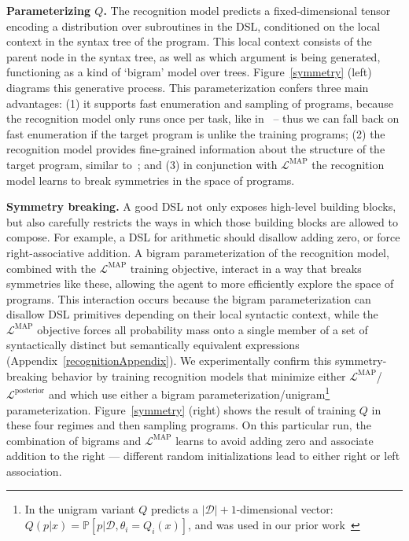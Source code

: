 \documentclass{article}
\newcommand{\probability}{\mathds{P}} %
\begin{document}
\noindent\textbf{Parameterizing $Q$.} The recognition model predicts a
fixed-dimensional tensor encoding a distribution over subroutines in
the DSL, conditioned on the local context in the syntax tree of the
program. This local context consists of the parent node in the syntax
tree, as well as which argument is being generated, functioning as a
kind of `bigram' model over trees. Figure~\ref{symmetry} (left)
diagrams this generative process.  This parameterization confers three
main advantages: (1) it supports fast enumeration and sampling of
programs, because the recognition model only runs once per
task, like in~\cite{balog2016deepcoder,ecc,menon2013machine} -- thus
we can fall back on fast enumeration if the target program is unlike
the training programs; (2) the recognition model provides fine-grained
information about the structure of the target program, similar
to~\cite{devlin2017robustfill,zavershynskyi2018naps}; and (3) in
conjunction with $\mathcal{L}^{\text{MAP}}$ the recognition model
learns to break symmetries in the space of programs.

\noindent\textbf{Symmetry breaking.} A good DSL not only exposes high-level building blocks, but also
carefully restricts the ways in which those building blocks are
allowed to compose.  For example,
a DSL for arithmetic should disallow adding zero, or force
right-associative addition. A bigram parameterization of the recognition
model, combined with the $\mathcal{L}^{\text{MAP}}$ training
objective, interact in a way that breaks symmetries like these, allowing the agent to more efficiently explore the space of
programs.  This interaction occurs because the bigram parameterization
can disallow DSL primitives depending on their local syntactic
context, while the $\mathcal{L}^{\text{MAP}}$ objective forces all
probability mass onto a single member of a set of syntactically
distinct but semantically equivalent expressions
(Appendix~\ref{recognitionAppendix}).
We experimentally confirm this symmetry-breaking
behavior by training recognition models that minimize either
$\mathcal{L}^{\text{MAP}}$/$\mathcal{L}^\text{posterior}$ and which
use either a bigram parameterization/unigram\footnote{In the unigram variant $Q$ predicts a $|\mathcal{D}| + 1$-dimensional vector: $Q(p|x) = \probability[p|\mathcal{D},\theta_i = Q_i(x)]$,
  and was used in our prior work~\cite{ecc}} parameterization.
Figure~\ref{symmetry} (right) shows the result of training $Q$ in these four regimes
and then sampling programs.
On this particular run,
the combination of
bigrams and $\mathcal{L}^{\text{MAP}}$ learns to
avoid adding zero and associate addition to the right ---
different random initializations
lead to either right or left association.
\end{document}
